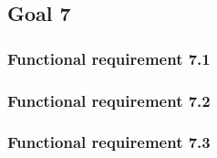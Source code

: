 \subsection{Goal 7}

\setcounter{secnumdepth}{3}
\subsubsection{Functional requirement 7.1}

\subsubsection{Functional requirement 7.2}

\subsubsection{Functional requirement 7.3}

